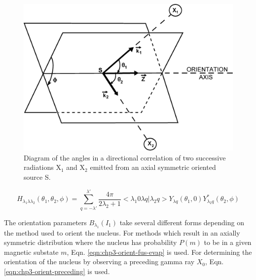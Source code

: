 \begin{figure}[hT!]
	\centerline{\includegraphics[height=0.35\textheight]{./img/c3/dco_setup.eps}}
	\caption{Diagram of the angles in a directional correlation of two successive radiations X$_{1}$ and X$_{2}$ emitted from an axial symmetric oriented source S.\label{fig:chp3-DCO-Angles}}
\end{figure}

\begin{equation}
\label{eqn:chp3-angular-function}
H_{\lambda{}_1\lambda{}\lambda{}_2}\left(\theta{}_1,\theta{}_2,\phi{}\right) = \sum\limits_{q=-\lambda{}'}^{\lambda{}'}\frac{4 \pi{}}{2\lambda{}_2 +1} <\lambda{}_1 0 \lambda{} q | \lambda{}_2 q> Y_{\lambda{}q}\left(\theta{}_1,0\right) Y^{*}_{\lambda{}_2q}\left(\theta{}_2,\phi{}\right)
\end{equation}


The orientation parameters $B_{\lambda{}_1}\left(I_1\right)$ take several different forms depending on the method used to orient the nucleus. For methods which result in an axially symmetric distribution where the nucleus has probability $P(m)$ to be in a given magnetic substate $m$, Eqn. \ref{eqn:chp3-orient-fus-evap} is used. For determining the orientation of the nucleus by observing a preceding gamma ray $X_0$, Eqn. \ref{eqn:chp3-orient-preceding} is used.

